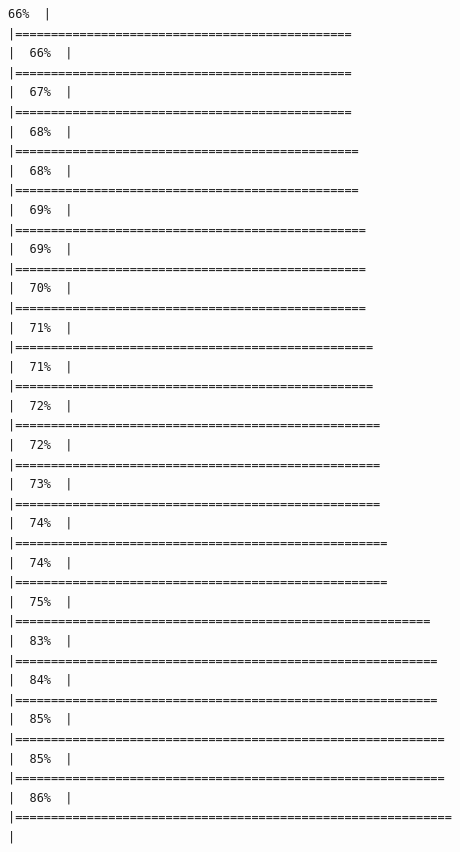 \documentclass[
  english,
  man,a4paper,mask,floatsintext]{apa6}
\begin{document}
\begin{verbatim}
66%  |                                                                              |===============================================                       |  66%  |                                                                              |===============================================                       |  67%  |                                                                              |===============================================                       |  68%  |                                                                              |================================================                      |  68%  |                                                                              |================================================                      |  69%  |                                                                              |=================================================                     |  69%  |                                                                              |=================================================                     |  70%  |                                                                              |=================================================                     |  71%  |                                                                              |==================================================                    |  71%  |                                                                              |==================================================                    |  72%  |                                                                              |===================================================                   |  72%  |                                                                              |===================================================                   |  73%  |                                                                              |===================================================                   |  74%  |                                                                              |====================================================                  |  74%  |                                                                              |====================================================                  |  75%  |                                                                              |==========================================================            |  83%  |                                                                              |===========================================================           |  84%  |                                                                              |===========================================================           |  85%  |                                                                              |============================================================          |  85%  |                                                                              |============================================================          |  86%  |                                                                              |=============================================================         |  
\end{verbatim}
\end{document}
